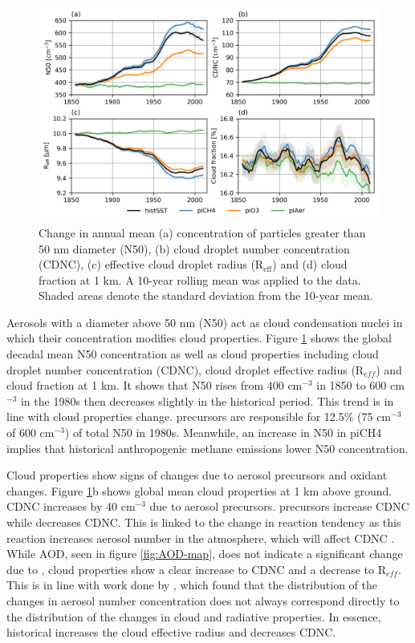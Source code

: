 \begin{figure}
    \centering
    \includegraphics[width=\linewidth]{Chapter3/Figs/f09_cloud-props.png}
    \caption{Change in annual mean (a) concentration of particles greater than 50 nm diameter (N50), (b) cloud droplet number concentration (CDNC), (c) effective cloud droplet radius (R$_{\textrm{eff}}$) and (d) cloud fraction at 1 km. A 10-year rolling mean was applied to the data. Shaded areas denote the standard deviation from the 10-year mean.}
    \label{fig:cloud}
\end{figure}

Aerosols with a diameter above 50 nm (N50) act as cloud condensation nuclei in which their concentration modifies cloud properties. Figure \ref{fig:cloud} shows the global decadal mean N50 concentration as well as cloud properties including cloud droplet number concentration (CDNC), cloud droplet effective radius (R$_{eff}$) and cloud fraction at 1 km. It shows that N50 rises from 400 cm$^{-3}$ in 1850 to 600 cm$^{-3}$ in the 1980s then decreases slightly in the historical period. This trend is in line with cloud properties change.  precursors are responsible for 12.5\% (75 cm$^{-3}$  of 600 cm$^{-3}$) of total N50 in 1980s. Meanwhile, an increase in N50 in piCH4 implies that historical anthropogenic methane emissions lower N50 concentration.

Cloud properties show signs of changes due to aerosol precursors and oxidant changes. Figure \ref{fig:cloud}b shows global mean cloud properties at 1 km above ground. CDNC increases by 40 cm$^{-3}$ due to aerosol precursors.  precursors increase CDNC while  decreases CDNC. This is linked to the change in  reaction tendency as this reaction increases aerosol number in the atmosphere, which will affect CDNC \citep{twomeyInfluencePollutionShortwave1977}. While AOD, seen in figure \ref{fig:AOD-map}, does not indicate a significant change due to , cloud properties show a clear increase to CDNC and a decrease to R$_{eff}$. This is in line with work done by \citet{karsetStrongImpactsAerosol2018}, which found that the distribution of the changes in aerosol number concentration does not always correspond directly to the distribution of the changes in cloud and radiative properties. In essence, historical  increases the cloud effective radius and decreases CDNC.

